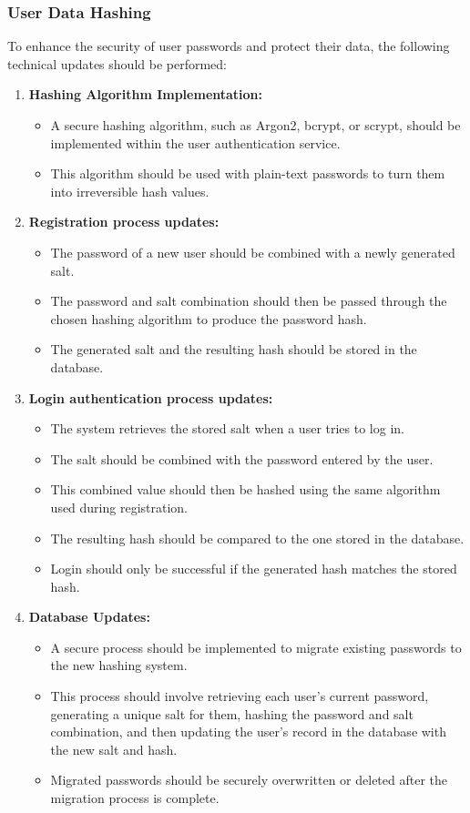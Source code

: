 \documentclass[11pt,a4paper]{article}
\begin{document}
\subsubsection{User Data Hashing}
To enhance the security of user passwords and protect their data, the following technical updates should be performed:

\begin{enumerate}
    \item \textbf{Hashing Algorithm Implementation:}
    \begin{itemize}
        \item A secure hashing algorithm, such as Argon2, bcrypt, or scrypt, should be implemented within the user authentication service.
    	\item This algorithm should be used with plain-text passwords to turn them into irreversible hash values.
    \end{itemize}
    \item \textbf{Registration process updates:}
    \begin{itemize}
        \item The password of a new user should be combined with a newly generated salt.
    	\item The password and salt combination should then be passed through the chosen hashing algorithm to produce the password hash.
        \item The generated salt and the resulting hash should be stored in the database.
    \end{itemize}
    \item \textbf{Login authentication process updates:}
    \begin{itemize}
        \item The system retrieves the stored salt when a user tries to log in.
    	\item The salt should be combined with the password entered by the user.
        \item This combined value should then be hashed using the same algorithm used during registration.
        \item The resulting hash should be compared to the one stored in the database.
        \item Login should only be successful if the generated hash matches the stored hash.
    \end{itemize}
    \item \textbf{Database Updates:}
    \begin{itemize}
        \item A secure process should be implemented to migrate existing passwords to the new hashing system.
    	\item This process should involve retrieving each user's current password, generating a unique salt for them, hashing the password and salt combination, and then updating the user's record in the database with the new salt and hash.
        \item Migrated passwords should be securely overwritten or deleted after the migration process is complete.
    \end{itemize}
\end{enumerate}
\end{document}
